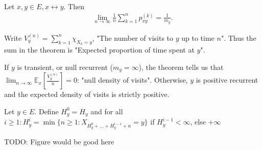 \begin{theorem}[]
	Let $x,y \in E, x \leftrightarrow y$. Then 
	\begin{align}
	\boxed{\lim_{n \to \infty}\frac{1}{n}\sum_{k=1}^{n} p_{xy}^{(k)}=\frac{1}{m_{y}}}
	.\end{align}
\end{theorem}
\begin{rmk}[]
	Write $V_{y}^{(n)}=\sum_{k=1}^{n} \chi_{X_k=y}$, "The number of visits to $y$ up to time $n$". Thus the sum in the theorem is "Expected proportion of time spent at $y$".
\end{rmk}

If $y$ is transient, or null recurrent ($m_y=\infty$), the theorem tells us that $\lim_{n \to \infty}\mathbb{E}_{x} \left[ \frac{V_y^{(n)}}{n} \right] =0$: "null density of visits". Otherwise, $y$ is positive recurrent and the expected density of visits is strictly positive.

\begin{defn}
	Let $y \in E$. Define $H_y^{0}=H_y$ and for all $i\geq 1: H_{y}^{i}= \min\{n \geq 1: X_{H_y^0 +  \ldots  + H_y^{i-1}+n}=y\}$ if $H_y^{i-1}<\infty$, else $+\infty$	
\end{defn}
TODO: Figure would be good here

